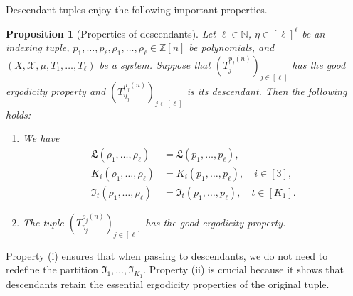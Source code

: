 \documentclass[11pt]{amsart}
\newtheorem{proposition}[lemma]{Proposition}
\theoremstyle{definition}
\newcommand{\N}{{\mathbb N}}
\newcommand{\Z}{{\mathbb Z}}
\newcommand{\CX}{{\mathcal X}}
\newcommand{\FI}{{\mathfrak I}}
\newcommand{\FL}{{\mathfrak L}}
\newcommand{\brac}[1]{\mathopen{}\left( #1 \mathclose{}\right)}
\begin{document}
Descendant tuples enjoy the following important properties.
\begin{proposition}[Properties of descendants]\label{P: properties of descendants}
    Let $\ell\in\N$, $\eta\in[\ell]^\ell$ be an indexing tuple, $p_1, \ldots, p_\ell, \rho_1, \ldots, \rho_\ell\in\Z[n]$ be polynomials, and $(X, \CX, \mu, T_1, \ldots, T_\ell)$ be a system. Suppose that $\brac{T_j^{p_j(n)}}_{j\in[\ell]}$ has the good ergodicity property and $\brac{T_{\eta_j}^{\rho_j(n)}}_{j\in[\ell]}$  is its descendant. Then the following holds:
    \begin{enumerate}
        \item We have
        \begin{align*}
    \FL(\rho_1, \ldots, \rho_\ell) &= \FL(p_1, \ldots, p_\ell), \\
    K_i(\rho_1, \ldots, \rho_\ell) &=K_i(p_1, \ldots, p_\ell),\quad  i\in[3],\\
    \FI_t(\rho_1, \ldots, \rho_\ell)&=\FI_t(p_1, \ldots, p_\ell), \quad t\in[K_1].
        \end{align*}
        \item The tuple $\brac{T_{\eta_j}^{\rho_j(n)}}_{j\in[\ell]}$ has the good ergodicity property.
    \end{enumerate}
\end{proposition}
Property (i) ensures that when passing to descendants, we do not need to redefine the partition $\FI_1, \ldots, \FI_{K_1}$. Property (ii) is crucial because it shows that descendants retain the essential ergodicity properties of the original tuple.
\end{document}
